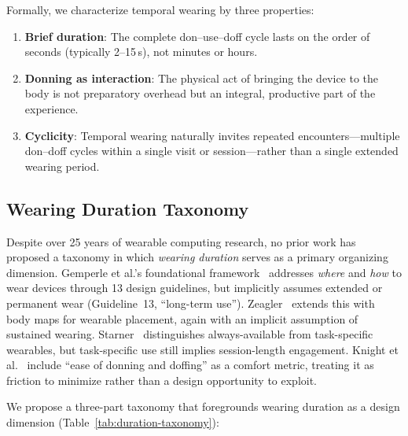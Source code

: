 Formally, we characterize temporal wearing by three properties:
\begin{enumerate}
    \item \textbf{Brief duration}: The complete don--use--doff cycle lasts on the order of seconds (typically 2--15\,s), not minutes or hours.
    \item \textbf{Donning as interaction}: The physical act of bringing the device to the body is not preparatory overhead but an integral, productive part of the experience.
    \item \textbf{Cyclicity}: Temporal wearing naturally invites repeated encounters---multiple don--doff cycles within a single visit or session---rather than a single extended wearing period.
\end{enumerate}


\subsection{Wearing Duration Taxonomy}

Despite over 25 years of wearable computing research, no prior work has proposed a taxonomy in which \textit{wearing duration} serves as a primary organizing dimension. Gemperle et al.'s foundational framework~\cite{gemperle1998wearability} addresses \textit{where} and \textit{how} to wear devices through 13 design guidelines, but implicitly assumes extended or permanent wear (Guideline~13, ``long-term use''). Zeagler~\cite{zeagler2017where} extends this with body maps for wearable placement, again with an implicit assumption of sustained wearing. Starner~\cite{starner2001challenges} distinguishes always-available from task-specific wearables, but task-specific use still implies session-length engagement. Knight et al.~\cite{knight2006comfort} include ``ease of donning and doffing'' as a comfort metric, treating it as friction to minimize rather than a design opportunity to exploit.

We propose a three-part taxonomy that foregrounds wearing duration as a design dimension (Table~\ref{tab:duration-taxonomy}):

